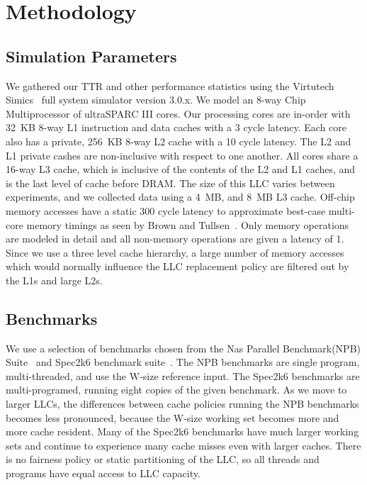 \section{Methodology}
\label{sec:methodology}
\subsection{Simulation Parameters}

We gathered our TTR and other performance statistics using the
Virtutech Simics~\cite{magnussonchristensson02} full 
system simulator version 3.0.x.  We model an 8-way Chip Multiprocessor
of ultraSPARC III cores.   Our processing cores
are in-order with 32~KB 8-way L1 instruction and data
caches with a 3 cycle latency.  Each core also has a private, 256~KB
8-way L2 cache with a 10 cycle latency.  The L2 and L1 private cashes
are non-inclusive with respect to one another.  All cores share a 16-way L3
cache, which is inclusive of the contents of the L2 and L1 caches, and
is the last level of cache before DRAM.  The size of this LLC varies
between experiments, and we collected data using a 4~MB, and 8~MB L3
cache.  Off-chip memory accesses have a static 300 cycle 
latency to approximate best-case multi-core memory timings as seen by
Brown and Tullsen~\cite{browntullsen08}.  Only memory operations are
modeled in detail and all non-memory operations are given a latency of
1.  Since we use a three level cache hierarchy, a large number of
memory accesses which would normally influence the LLC replacement policy are
filtered out by the L1s and large L2s.

\subsection{Benchmarks}

We use a selection of benchmarks chosen from the Nas Parallel
Benchmark(NPB)  Suite~\cite{NPB94} and Spec2k6 benchmark
suite~\cite{henning05}.  The NPB benchmarks are single
program, multi-threaded, and use the W-size reference input.  The Spec2k6 benchmarks are
multi-programed, running eight copies of the given benchmark.  As we
move to larger LLCs, the differences between cache policies
running  the NPB benchmarks
becomes less pronounced, because the W-size working set becomes more
and more cache resident.  Many of the Spec2k6 benchmarks have much
larger working sets and  continue to
experience many cache misses even with larger caches.  There is
no fairness policy or static partitioning of the LLC, so all threads
and programs have equal access to LLC capacity.

